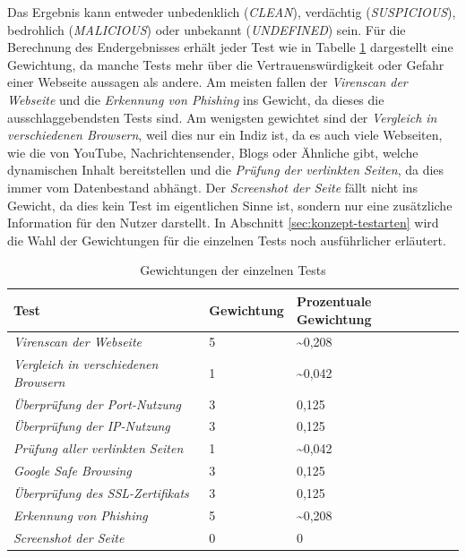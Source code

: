 Das Ergebnis kann entweder unbedenklich (\textit{CLEAN}), verdächtig (\textit{SUSPICIOUS}),
bedrohlich (\textit{MALICIOUS}) oder unbekannt (\textit{UNDEFINED}) sein. Für die Berechnung des
Endergebnisses erhält jeder Test wie in Tabelle \ref{tbl:test-weights} dargestellt eine Gewichtung,
da manche Tests mehr über die Vertrauenswürdigkeit oder Gefahr einer Webseite aussagen als andere.
Am meisten fallen der \textit{Virenscan der Webseite} und die \textit{Erkennung von Phishing} ins
Gewicht, da dieses die ausschlaggebendsten Tests sind. Am wenigsten gewichtet sind der
\textit{Vergleich in verschiedenen Browsern}, weil dies nur ein Indiz ist, da es auch viele
Webseiten, wie die von YouTube, Nachrichtensender, Blogs oder Ähnliche gibt, welche
dynamischen Inhalt bereitstellen und die \textit{Prüfung der verlinkten Seiten}, da dies immer vom
Datenbestand abhängt. Der \textit{Screenshot der Seite} fällt nicht ins Gewicht, da dies kein Test
im eigentlichen Sinne ist, sondern nur eine zusätzliche Information für den Nutzer darstellt. In
Abschnitt \ref{sec:konzept-testarten} wird die Wahl der Gewichtungen für die einzelnen Tests noch
ausführlicher erläutert.

\begin{table}[H]
\centering
\begin{tabular}{|l|l|l|l|}
\hline
\textbf{Test} & \textbf{Gewichtung} & \textbf{Prozentuale Gewichtung} \\\hline
\textit{Virenscan der Webseite} & 5 & \textasciitilde0,208\\\hline
\textit{Vergleich in verschiedenen Browsern} & 1 & \textasciitilde0,042\\\hline
\textit{Überprüfung der Port-Nutzung} & 3 & 0,125\\\hline
\textit{Überprüfung der IP-Nutzung} & 3 & 0,125\\\hline
\textit{Prüfung aller verlinkten Seiten} & 1 & \textasciitilde0,042\\\hline
\textit{Google Safe Browsing} & 3 & 0,125\\\hline
\textit{Überprüfung des SSL-Zertifikats} & 3 & 0,125\\\hline
\textit{Erkennung von Phishing} & 5 & \textasciitilde0,208\\\hline
\textit{Screenshot der Seite} & 0 & 0\\\hline
\end{tabular}
\caption{Gewichtungen der einzelnen Tests}
\label{tbl:test-weights}
\end{table}

